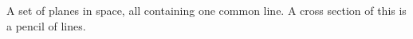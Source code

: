 A set of planes in space, all containing one common line.
A cross section of this is a pencil of lines.